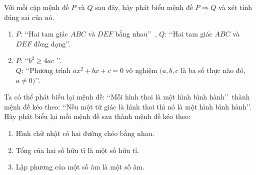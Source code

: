 \begin{bt}%
	Với mỗi cặp mệnh đề $P$ và $Q$ sau đây, hãy phát biểu mệnh đề $P \Rightarrow Q$ và xét tính đúng sai của nó.
	\begin{enumerate}
		\item $P$: \lq\lq Hai tam giác $ABC$ và $DEF$ bằng nhau\rq\rq\, , 
		$Q$: \lq\lq Hai tam giác $ABC$ và $DEF$ đồng dạng\rq\rq.
		\item  $P$: \lq\lq $b^2 \geq 4ac$ \rq\rq.\\
		$Q$: \lq\lq Phương trình $ax^2+bx+c=0$ vô nghiệm $(a,b,c$ là ba số thực nào đó, $a \ne 0)$\rq\rq.
	\end{enumerate}
\end{bt}

\begin{bt}%
	Ta có thể phát biểu lại mệnh đề:
	\lq\lq Mỗi hình thoi là một hình bình hành\rq\rq\, thành mệnh đề kéo theo: \lq\lq Nếu một tứ giác là hình thoi thì nó là một hình bình hành\rq\rq.\\
	Hãy phát biểu lại mỗi mệnh đề sau thành mệnh đề kéo theo:
	\begin{enumerate}
		\item Hình chữ nhật có hai đường chéo bằng nhau.
		\item  Tổng của hai số hữu tỉ là một số hữu tỉ.
		\item  Lập phương của một số âm là một số âm.
	\end{enumerate}
\end{bt}

